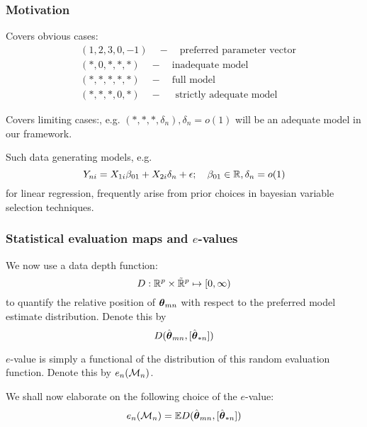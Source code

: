 \documentclass[10pt]{beamer}
\theoremstyle{definition}
\begin{document}

\begin{frame}
\frametitle{Motivation}

{\colbbf Covers obvious cases:} 
%
\begin{align*}
& (1, 2, 3, 0, -1) \quad - \quad \text{preferred parameter vector}\\
& (*, 0, *, *, *) \quad - \quad \text{inadequate model}\\
& (*, *, *, *, *) \quad - \quad \text{full model}\\
& (*, *, *, 0, *) \quad - \quad \text{ strictly adequate model}
\end{align*}

\vspace{1em}
{\colbbf Covers limiting cases:}, e.g. $(*, *, *, \delta_n), \delta_n = o(1)$ will be an adequate model in our framework.
%
$$ 
$$
%

Such data generating models, e.g.
$$
Y_{ni} = X_{1i} \beta_{01} + X_{2i} \delta_n + \epsilon; \quad \beta_{01} \in {\mathbb{R}}, \delta_n = o(1)
$$
for linear regression, frequently arise from prior choices in bayesian variable selection techniques.
\end{frame}


\begin{frame}
\frametitle{Statistical evaluation maps and $e$-values}
We now use a {\colbit data depth function}:
%
$$
D: {\mathbb{R}}^{p} \times \tilde {{\mathbb{R}}}^{p} \mapsto [0, \infty)
$$
%
to quantify the relative position of ${\boldsymbol{\theta}}_{m n}$ with respect to the preferred model estimate distribution. Denote this by
%
$$
D ( \hat {{\boldsymbol{\theta}}}_{m n}, [\hat {{\boldsymbol{\theta}}}_{* n}])
$$

{\colbbf $e$-value} is simply a functional of the distribution of this random evaluation function. Denote this by $e_n ({\cal{M}}_n)$.

\vspace{1em}
We shall now elaborate on the following choice of the $e$-value:
%
$$
e_n ({\cal{M}}_n) = {\mathbb{E}} D ( \hat {{\boldsymbol{\theta}}}_{m n}, [\hat {{\boldsymbol{\theta}}}_{* n}])
$$

\end{frame}
\end{document}
